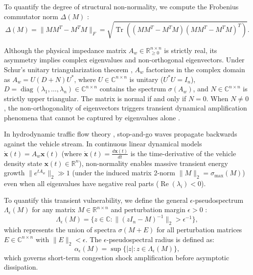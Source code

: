 \documentclass[journal]{IEEEtran}
\begin{document}
To quantify the degree of structural non-normality, we compute the Frobenius commutator norm $\Delta(M)$ \cite{Henrici1962}:
\begin{equation}
\Delta(M) = \| M M^T - M^T M \|_F = \sqrt{\operatorname{Tr}\left( (M M^T - M^T M)(M M^T - M^T M)^T \right)}.
\label{eq:commutator}
\end{equation}

Although the physical impedance matrix $A_w \in \mathbb{R}_{\ge 0}^{n \times n}$ is strictly real, its asymmetry implies complex eigenvalues and non-orthogonal eigenvectors. Under Schur's unitary triangularization theorem \cite{Schur1909}, $A_w$ factorizes in the complex domain as $A_w = U (D + N) U^*$, where $U \in \mathbb{C}^{n \times n}$ is unitary ($U^* U = I_n$), $D = \operatorname{diag}(\lambda_1, \dots, \lambda_n) \in \mathbb{C}^{n \times n}$ contains the spectrum $\sigma(A_w)$, and $N \in \mathbb{C}^{n \times n}$ is strictly upper triangular. The matrix is normal if and only if $N = 0$. When $N \neq 0$, the non-orthogonality of eigenvectors triggers transient dynamical amplification phenomena that cannot be captured by eigenvalues alone \cite{Trefethen2005}.

In hydrodynamic traffic flow theory \cite{Lighthill1955, Richards1956, Kerner2009, Whitham2011}, stop-and-go waves propagate backwards against the vehicle stream. In continuous linear dynamical models $\dot{\mathbf{x}}(t) = A_w \mathbf{x}(t)$ (where $\dot{\mathbf{x}}(t) = \frac{d\mathbf{x}(t)}{dt}$ is the time-derivative of the vehicle density state $\mathbf{x}(t) \in \mathbb{R}^n$), non-normality enables massive transient energy growth $\|e^{t A_w}\|_2 \gg 1$ (under the induced matrix 2-norm $\|M\|_2 = \sigma_{\max}(M)$) even when all eigenvalues have negative real parts ($\operatorname{Re}(\lambda_i) < 0$).

To quantify this transient vulnerability, we define the general $\epsilon$-pseudospectrum $\Lambda_\epsilon(M)$ for any matrix $M \in \mathbb{R}^{n \times n}$ and perturbation margin $\epsilon > 0$ \cite{Trefethen2005}:
\begin{equation}
\Lambda_\epsilon(M) = \{ z \in \mathbb{C} : \|(z I_n - M)^{-1}\|_2 > \epsilon^{-1} \},
\label{eq:pseudospectrum}
\end{equation}
which represents the union of spectra $\sigma(M + E)$ for all perturbation matrices $E \in \mathbb{C}^{n \times n}$ with $\|E\|_2 < \epsilon$. The $\epsilon$-pseudospectral radius is defined as:
\begin{equation}
\alpha_\epsilon(M) = \sup \{ |z| : z \in \Lambda_\epsilon(M) \},
\label{eq:pseudospectral_radius}
\end{equation}
which governs short-term congestion shock amplification before asymptotic dissipation.
\end{document}
